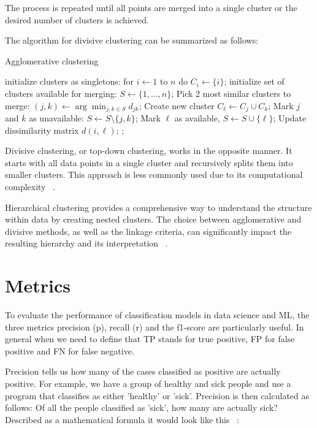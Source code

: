The process is repeated until all points are merged into a single cluster or the desired number of clusters is achieved.

The algorithm for divisive clustering can be summarized as follows:

\FloatBarrier
\begin{algorithm}
\caption{Agglomerative clustering}
\begin{algorithmic}[1]
\State initialize clusters as singletons: for \(i \leftarrow 1\) to \(n\) do \(C_i \leftarrow \{i\}\);
\State initialize set of clusters available for merging: \(S \leftarrow \{1, \ldots, n\}\);
\Repeat
\State Pick 2 most similar clusters to merge: \((j, k) \leftarrow \arg \min_{j,k \in S} d_{jk}\);
\State Create new cluster \(C_\ell \leftarrow C_j \cup C_k\);
\State Mark \(j\) and \(k\) as unavailable: \(S \leftarrow S \setminus \{j, k\}\);
\State Mark \(\ell\) as available, \(S \leftarrow S \cup \{\ell\}\);
\State Update dissimilarity matrix \(d(i, \ell)\);
\EndFor
\EndIf
{};
\end{algorithmic}
\end{algorithm}
\FloatBarrier

Divisive clustering, or top-down clustering, works in the opposite manner. It starts with all data points in a single cluster and recursively splits them into smaller clusters. This approach is less commonly used due to its computational complexity ~\cite{murphy2013machine}.

Hierarchical clustering provides a comprehensive way to understand the structure within data by creating nested clusters. The choice between agglomerative and divisive methods, as well as the linkage criteria, can significantly impact the resulting hierarchy and its interpretation ~\cite{murphy2013machine}.

\section{Metrics}

To evaluate the performance of classification models in data science and ML, the three metrics precision (p), recall (r) and the f1-score are particularly useful. 
In general when we need to define that TP stands for true positive, FP for false positive and FN for false negative. 

Precision tells us how many of the cases classified as positive are actually positive. For example, we have a group of healthy and sick people and use a program that classifies as either 'healthy' or 'sick'. Precision is then calculated as follows: Of all the people classified as 'sick', how many are actually sick? Described as a mathematical formula it would look like this ~\cite{10.1007/978-3-540-31865-1_25}: 

